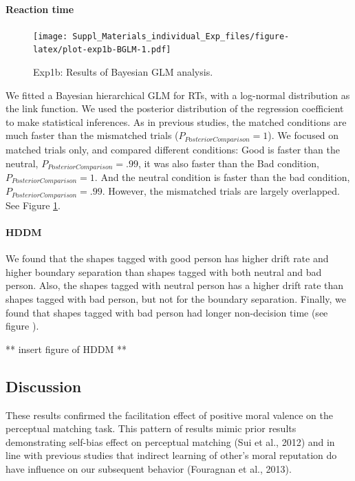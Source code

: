 \documentclass[
  english,
  man]{apa6}
\let\oldparagraph\paragraph
\renewcommand{\paragraph}[1]{\oldparagraph{#1}\mbox{}}
\begin{document}
\hypertarget{reaction-time-1}{%
\paragraph{Reaction time}\label{reaction-time-1}}

\begin{figure}
\centering
\texttt{[image: Suppl\_Materials\_individual\_Exp\_files/figure-latex/plot-exp1b-BGLM-1.pdf]}
\caption{\label{fig:plot-exp1b-BGLM}Exp1b: Results of Bayesian GLM analysis.}
\end{figure}

We fitted a Bayesian hierarchical GLM for RTs, with a log-normal distribution as the link function. We used the posterior distribution of the regression coefficient to make statistical inferences. As in previous studies, the matched conditions are much faster than the mismatched trials (\(P_{PosteriorComparison} = 1\)). We focused on matched trials only, and compared different conditions: Good is faster than the neutral, \(P_{PosteriorComparison} = .99\), it was also faster than the Bad condition, \(P_{PosteriorComparison} = 1\). And the neutral condition is faster than the bad condition, \(P_{PosteriorComparison} = .99\). However, the mismatched trials are largely overlapped. See Figure \ref{fig:plot-exp1b-BGLM}.

\hypertarget{hddm-1}{%
\paragraph{HDDM}\label{hddm-1}}

We found that the shapes tagged with good person has higher drift rate and higher boundary separation than shapes tagged with both neutral and bad person. Also, the shapes tagged with neutral person has a higher drift rate than shapes tagged with bad person, but not for the boundary separation. Finally, we found that shapes tagged with bad person had longer non-decision time (see figure ).

** insert figure of HDDM **

\hypertarget{discussion}{%
\subsection{Discussion}\label{discussion}}

These results confirmed the facilitation effect of positive moral valence on the perceptual matching task. This pattern of results mimic prior results demonstrating self-bias effect on perceptual matching (Sui et al., 2012) and in line with previous studies that indirect learning of other's moral reputation do have influence on our subsequent behavior (Fouragnan et al., 2013).
\end{document}
